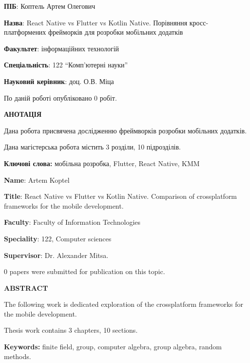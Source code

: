 
\textbf{ПІБ}: Коптель Артем Олегович

\textbf{Назва}: React Native vs Flutter vs Kotlin Native. Порівняння кросс-платформених фрейморків для розробки мобільних додатків

\textbf{Факультет}: інформаційних технологій

\textbf{Спеціальність}: 122 ``Комп'ютерні науки''

\textbf{Науковий керівник}: доц. О.В. Міца

По даній роботі опубліковано $0$ робіт.

\begin{center}
\textbf{АНОТАЦІЯ}
\end{center}

Дана робота присвячена дослідженню фреймворків розробки мобільних додатків.

Дана магістерська робота містить 3 розділи, 10 підрозділів.

{\bf Ключові слова:} мобільна розробка, Flutter, React Native, KMM

\newpage

\textbf{Name}: Artem Koptel

\textbf{Title}: React Native vs Flutter vs Kotlin Native. Comparison of crossplatform frameworks for the mobile development.

\textbf{Faculty}: Faculty of Information Technologies

\textbf{Speciality}: 122, Computer sciences

\textbf{Supervisor}: Dr. Alexander Mitsa. 

$0$ papers were submitted for publication on this topic.

\begin{center}
\textbf{ABSTRACT}
\end{center}

The following work is dedicated exploration of the crossplatform frameworks for the mobile development.

Thesis work contains 3 chapters, 10 sections.

{\bf Keywords:} finite field, group, computer algebra, group algebra, random methods.

